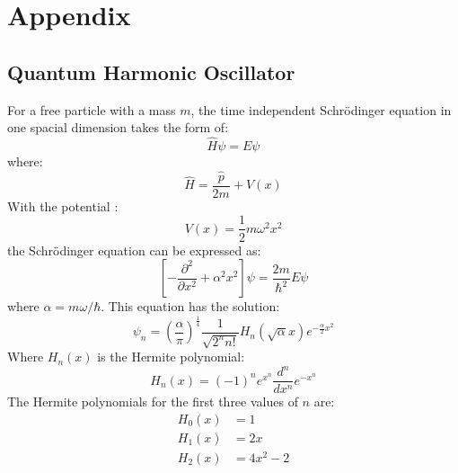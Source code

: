 %
	\chapter{Appendix}
	\label{Appendix}
	\section{Quantum Harmonic Oscillator}
	\label{Appendix - Quantum Harmonic Oscillator}
		For a free particle with a mass $m$, the time independent Schr{\" o}dinger equation in one spacial dimension takes the form of:
		\begin{equation}
			\hat{H}\psi=E\psi
		\end{equation}
		where:
		\begin{equation}
			\hat{H}=\frac{\hat{p}}{2m}+V\left(x\right)
		\end{equation}
		With the potential \cite{b33}:
		\begin{equation}
			V\left(x\right)=\frac{1}{2}m\omega^{2}x^{2}
		\end{equation}
		the Schr{\" o}dinger equation can be expressed as:
		\begin{equation}
			\left[-\frac{\partial^{2}}{\partial x^{2}}+\alpha^{2}x^{2}\right]\psi=\frac{2m}{\hbar^{2}}E\psi
			\label{QHO}
		\end{equation}
		where $\alpha=m\omega/\hbar$. This equation has the solution:
		\begin{equation}
			\psi_{n}=\left(\frac{\alpha}{\pi}\right)^{\frac{1}{4}}\frac{1}{\sqrt{2^{n}n!}}H_{n}\left(\sqrt{\alpha}x\right)e^{-\frac{\alpha}{2}x^{2}}
		\end{equation}
		Where $H_{n}\left(x\right)$ is the Hermite polynomial:
		\begin{equation}
			H_{n}\left(x\right)=\left(-1\right)^{n}e^{x^{n}}\frac{d^{n}}{dx^{n}}e^{-x^{n}}
		\end{equation}
		The Hermite polynomials for the first three values of $n$ are:
		\begin{align}
			H_{0}\left(x\right)&=1\\
			H_{1}\left(x\right)&=2x\\
			H_{2}\left(x\right)&=4x^{2}-2
		\end{align}
